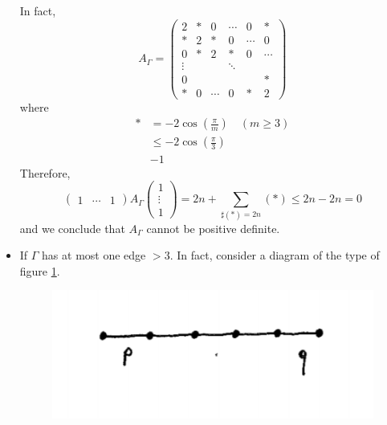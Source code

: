 \documentclass[envcountsame,envcountchap]{svmono}
\begin{document}
\begin{itemize}
In fact, 
\begin{equation}
A_\Gamma = \begin{pmatrix}
2 &* &0 &\cdots &0 &* \\
* &2 &* &0 &\cdots &0 \\ 
0 &* &2 &* &0 &\cdots \\
\vdots & & &\ddots & & \\
0 & & & & &* \\
* &0 &\cdots &0 &* &2
\end{pmatrix}
\end{equation} where
\begin{equation}
\begin{split}
* &= - 2 \cos \left( \frac{\pi}{m} \right) \quad (m\ge 3 ) \\
&\le - 2 \cos \left( \frac{\pi}{3} \right) \\
&-1
\end{split}
\end{equation} Therefore, 
\begin{equation}
\begin{pmatrix}
1 &\cdots &1
\end{pmatrix} A_\Gamma \begin{pmatrix}
1 \\
\vdots \\
1
\end{pmatrix} = 2n + \sum_{\sharp(*) = 2n} (*) \le 2n - 2n = 0
\label{strategy}
\end{equation} and we conclude that $A_\Gamma$ cannot be positive definite.

\item If $\Gamma$ has at most one edge $>3$. In fact, consider a diagram of the type of figure \ref{cours9fig4}.

\begin{figure}[h!]
\centering
\includegraphics[scale=0.6]{cours9fig4.png}
\caption{}
\label{cours9fig4}
\end{figure}    


\end{itemize}
\end{document}
